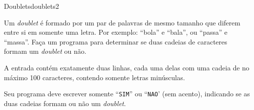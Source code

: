 \documentclass[12pt,a4paper,oneside]{article}
\begin{document}
\begin{problem}{Doublets}{doublets}{2}
 
Um \textit{doublet} é formado por um par de palavras de mesmo tamanho que diferem entre si em somente uma letra. Por exemplo: ``bola'' e ``bala'', ou ``passa'' e ``massa''. Faça um programa para determinar se duas cadeias de caracteres formam um \textit{doublet} ou não.

%

\InputFile

A entrada contém exatamente duas linhas, cada uma delas com uma cadeia de no máximo 100 caracteres, contendo somente letras minúsculas.

\OutputFile

Seu programa deve escrever somente ``\texttt{SIM}'' ou ``\texttt{NAO}' (sem acento), indicando se as duas cadeias formam ou não um \textit{doublet}.

\Example

\begin{example}
%
\end{example}

\begin{example}
%
\end{example}

\begin{example}
%
\end{example}


\end{problem}
\end{document}
